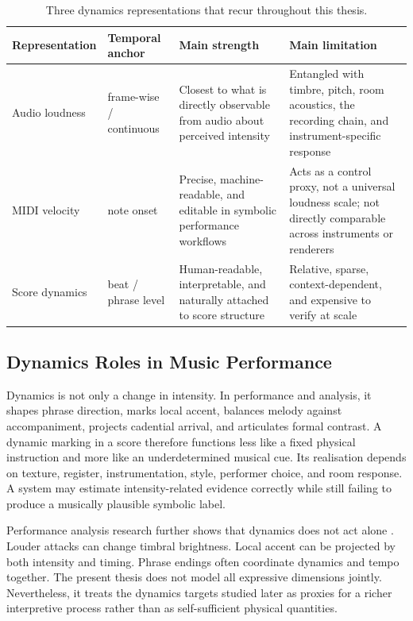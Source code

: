 \begin{table}[!htbp]
\centering
\caption{Three dynamics representations that recur throughout this thesis.}
\label{tab:bg_dynamics_compare}
\small
\setlength{\tabcolsep}{4pt}
\renewcommand{\arraystretch}{1.18}
\begin{tabularx}{\textwidth}{
>{\raggedright\arraybackslash}p{}
>{\raggedright\arraybackslash}p{}
>{\hsize=0.92\hsize\raggedright\arraybackslash}X
>{\hsize=1.08\hsize\raggedright\arraybackslash}X
}
\toprule
\textbf{Representation} & \textbf{Temporal anchor} & \textbf{Main strength} & \textbf{Main limitation} \\
\midrule
Audio loudness & frame-wise / continuous & Closest to what is directly observable from audio about perceived intensity & Entangled with timbre, pitch, room acoustics, the recording chain, and instrument-specific response \\
MIDI velocity & note onset & Precise, machine-readable, and editable in symbolic performance workflows & Acts as a control proxy, not a universal loudness scale; not directly comparable across instruments or renderers \\
Score dynamics & beat / phrase level & Human-readable, interpretable, and naturally attached to score structure & Relative, sparse, context-dependent, and expensive to verify at scale \\
\bottomrule
\end{tabularx}
\end{table}


\subsection{Dynamics Roles in Music Performance}
\label{sec:bg:dynamics:musical}

Dynamics is not only a change in intensity. In performance and analysis, it shapes phrase direction, marks local accent, balances melody against accompaniment, projects cadential arrival, and articulates formal contrast. A dynamic marking in a score therefore functions less like a fixed physical instruction and more like an underdetermined musical cue. Its realisation depends on texture, register, instrumentation, style, performer choice, and room response. A system may estimate intensity-related evidence correctly while still failing to produce a musically plausible symbolic label.

Performance analysis research further shows that dynamics does not act alone \cite{oore2020time, eduardo2018computational}. Louder attacks can change timbral brightness. Local accent can be projected by both intensity and timing. Phrase endings often coordinate dynamics and tempo together. The present thesis does not model all expressive dimensions jointly. Nevertheless, it treats the dynamics targets studied later as proxies for a richer interpretive process rather than as self-sufficient physical quantities.


